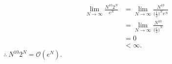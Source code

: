 \documentclass[
  coursecode={MTHE 418},
  assignmentname={Homework \homeworknumber},
  studentnumber=20053722,
  name={Bryan Hoang},
  draft,
  final,
]{
  ltxanswer%
}
\begin{document}
\begin{questions}
\begin{parts}
      \part{}
      \begin{solution}
        \begin{align*}
          \lim_{N\to\infty} \frac{N^{10}2^{N}}{e^{N}} &= \lim_{N\to\infty} \frac{N^{10}}{\bigl(\frac{1}{2}\bigr)^{N} e^{N}} \\
                                                      &=\lim_{N\to\infty} \frac{N^{10}}{\bigl(\frac{e}{2}\bigr)^{N}}        \\
                                                      &= 0                                                                  \\
                                                      &< \infty.
        \end{align*}
        \(\therefore\ N^{10} 2^{N} = \mathcal{O}(e^{N})\).
      \end{solution}
    \end{parts}
  \end{questions}
\end{document}
